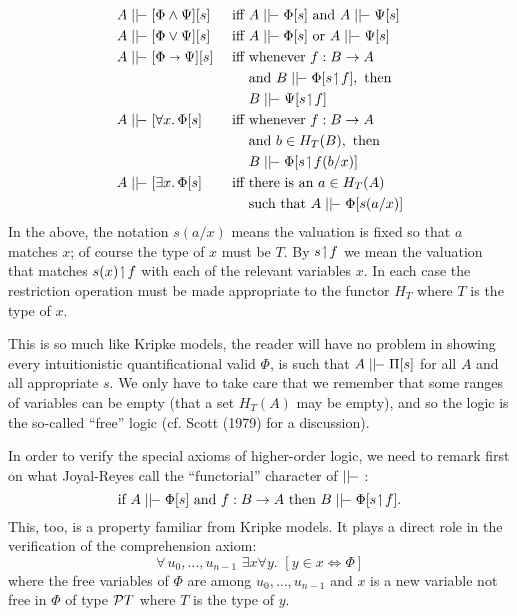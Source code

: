 \begin{align*}
  A & \mm [\Phi \land \Psi] [s] & {\textrm{ iff }} & A \mm \Phi[s] \textrm{ and } A \mm \Psi[s]\\
  A & \mm [\Phi \lor \Psi] [s] & {\textrm{ iff }} & A \mm \Phi[s] \textrm{ or } A \mm \Psi[s]\\
  A & \mm [\Phi \imp \Psi] [s] & {\textrm{ iff }} & \textrm{whenever } f:\BA\\
  &&& \textrm{and } B \mm \Phi[s \res f], \textrm{ then} \\
  &&& B \mm \Psi[s \res f]\\
  A & \mm [\forall x.\, \Phi [s] & {\textrm{ iff }} & \textrm{whenever } f:\BA\\
  &&& \textrm{and } b \in H_{T}(B), \textrm{ then} \\
  &&& B \mm \Phi[s \res f (b/x)]\\
  A & \mm [\exists x.\, \Phi [s] & {\textrm{ iff }} & \textrm{there is an } a \in H_T(A)\\
  &&& \textrm{such that } A \mm \Phi[s(a/x)]
\end{align*}
In the above, the notation $s(a/x)$ means the valuation is fixed so that $a$ matches $x$;
of course the type of $x$ must be $T$. By $s \res f$ we mean the valuation that matches
$s(x)\res f$ with each of the relevant variables $x$. In each case the restriction
operation must be made appropriate to the functor $H_T$ where $T$ is the type of $x$.

This is so much like Kripke models, the reader will have no problem in showing every
intuitionistic quantificational valid $\Phi$, is such that $A \mm \Pi[s]$ for all $A$ and
all appropriate $s$. We only have to take care that we remember that some ranges of
variables can be empty (that a set $H_T(A)$ may be empty), and so the logic is the
so-called ``free'' logic (cf. Scott (1979) for a discussion).

In order to verify the special axioms of higher-order logic, we need to remark first on
what Joyal-Reyes call the ``functorial'' character of $\mm$ :
$$
\textrm{if } A\mm\Phi[s] \textrm{ and } f:\BA \textrm{ then } B \mm \Phi[s \res f] .
$$
This, too, is a property familiar from Kripke models. It plays a direct role in the
verification of the comprehension axiom:
$$
\forall\, u_0, \dots, u_{n-1} \,\, \exists x \forall y .\,\,  [ y \in x \iff \Phi]
$$
where the free variables of $\Phi$ are among $u_0, \dots, u_{n-1}$ and $x$ is a new
variable not free in $\Phi$ of type $\P T$ where $T$ is the type of $y$.

